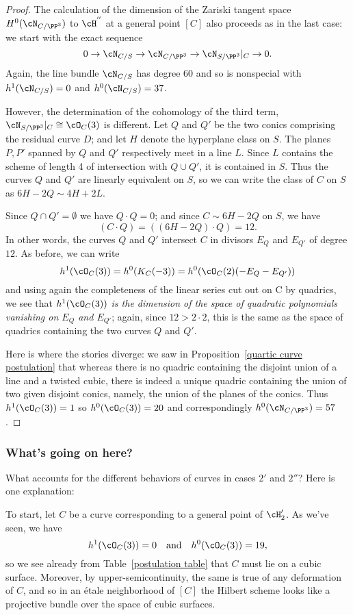 \begin{proof}
The calculation of the dimension of the Zariski tangent space $H^0(\cN_{C/\PP^3})$ to $ \cH^{''}$ at a general point $[C]$ also proceeds as in the last case: we start with the exact sequence
$$
0 \to \cN_{C/S} \to \cN_{C/\PP^3} \to \cN_{S/\PP^3}|_C \to 0.
$$ 
Again, the line bundle $\cN_{C/S}$ has degree 60 and so is nonspecial with $h^1(\cN_{C/S}) = 0$ and $h^0(\cN_{C/S}) = 37$.

However, the determination of the cohomology of the third term, $\cN_{S/\PP^3}|_C \cong \cO_C(3)$ is different. Let $Q$ and $Q'$ be the  two conics comprising the residual curve $D$; and let $H$ denote the hyperplane class on $S$. The planes $P,P'$ spanned by $Q$ and $Q'$ respectively meet in a line $L$. Since $L$ contains the scheme of length 4 of intersection with $Q\cup Q'$, it is contained in $S$. Thus the curves $Q$ and $Q'$ are linearly equivalent on $S$, so we can write the class of $C$ on $S$ as $6H-2Q \sim 4H+2L$.

Since $Q\cap Q' = \emptyset$ we have  $Q \cdot Q = 0$; and since $C \sim 6H - 2Q$ on $S$, we have
$$
(C\cdot Q) = ((6H - 2Q) \cdot Q) = 12.
$$
In other words, the curves $Q$ and $Q'$ intersect $C$ in divisors $E_Q$ and $E_{Q'}$ of degree $12$. As before, we can write
$$
h^1(\cO_C(3)) = h^0(K_C(-3)) = h^0(\cO_C(2)(-E_Q-E_{Q'}))
$$
and using again the completeness of the linear series cut out on C by quadrics, we see that \emph{$h^1(\cO_C(3))$ is the dimension of the space of quadratic polynomials vanishing on $E_Q$ and $E_{Q'}$}; again, since $12 > 2\cdot 2$, this is the same as the space of quadrics containing the two curves $Q$ and $Q'$. 

Here is where the stories diverge: we saw in Proposition~\ref{quartic curve postulation} that whereas there is no quadric containing the disjoint union of a line and a twisted cubic, there is indeed a unique quadric containing the union of two given disjoint conics, namely, the union of the planes of the conics.  
Thus $h^1(\cO_C(3))=1$ so  $h^0(\cO_C(3)) = 20$ and correspondingly $h^0(\cN_{C/\PP^3}) = 57$.
\end{proof}

\subsubsection{What's going on here?}

What accounts for the different behaviors of curves in cases $2'$ and $2''$? Here is one explanation:

To start, let $C$ be a curve corresponding to a general point of $\cH_{2}'$. As we've seen, we have
$$
h^1(\cO_C(3)) = 0 \quad \text{and} \quad h^0(\cO_C(3)) = 19,
$$
so we see already from Table~\ref{postulation table} that $C$ must lie on a cubic surface. Moreover, by upper-semicontinuity, the same is true of any deformation of $C$, and so in an \'etale neighborhood of $[C]$ the Hilbert scheme looks like a projective bundle over the space of cubic surfaces.


